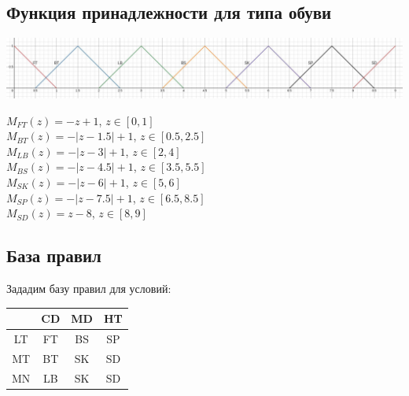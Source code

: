 \documentclass[12pt,a4paper]{report}
\begin{document}
\subsection*{Функция принадлежности для типа обуви}
\begin{center}
\includegraphics*[width=15cm]{func_3.jpg}    
\end{center}
$M_{FT}(z) = -z+1$, $z \in [0, 1]$ \\
$M_{BT}(z) = - |z-1.5|+1$, $z \in [0.5, 2.5]$ \\
$M_{LB}(z) = - |z-3|+1$, $z \in [2, 4]$ \\
$M_{BS}(z) = - |z-4.5|+1$, $z \in [3.5, 5.5]$ \\
$M_{SK}(z) = - |z-6|+1$, $z \in [5, 6]$ \\
$M_{SP}(z) = - |z-7.5|+1$, $z \in [6.5, 8.5]$ \\
$M_{SD}(z) = z-8$, $z \in [8, 9]$ \\
\subsection*{База правил}
Зададим базу правил для условий:\\
\hfill\break
\begin{tabular}{|c||c|c|c|}
    \hline
       & CD & MD & HT \\
    \hline
    \hline
    LT & FT & BS & SP \\
    \hline
    MT & BT & SK & SD \\
    \hline
    MN & LB & SK & SD \\
    \hline
\end{tabular}
\end{document}
